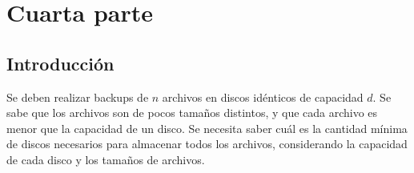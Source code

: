 

\renewcommand{\contentsname}{Contenidos}
\renewcommand{\listfigurename}{Listado de Figuras}
\renewcommand{\listtablename}{Listado de Tablas}
\renewcommand{\tablename}{Tabla}

\newcommand{\minimize}{\texttt{Minimize}\quad\,\,}
\newcommand{\maximize}{\texttt{Maximize}\quad\,\,}
\newcommand{\subjto}{\texttt{Subject to}\quad}

\maketitle

\tableofcontents

\newpage

\section{Cuarta parte}

\subsection{Introducción}

Se deben realizar backups de $n$ archivos en discos idénticos de
capacidad $d$.  Se sabe que los archivos son de pocos tamaños distintos,
y que cada archivo es menor que la capacidad de un disco. Se necesita
saber cuál es la cantidad mínima de discos necesarios para almacenar
todos los archivos, considerando la capacidad de cada disco y los
tamaños de archivos.

